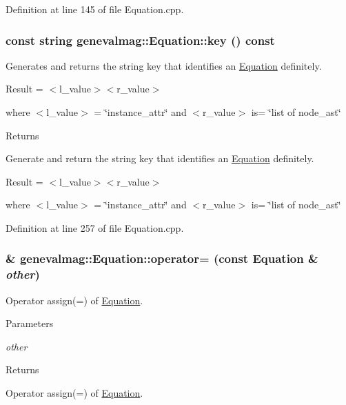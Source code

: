 Definition at line 145 of file Equation.cpp.

\hypertarget{classgenevalmag_1_1Equation_a2aa74b8b1df5b16dd9cc7d457cd7e370}{
\subsubsection[{key}]{\setlength{\rightskip}{0pt plus 5cm}const string genevalmag::Equation::key () const}}
\label{classgenevalmag_1_1Equation_a2aa74b8b1df5b16dd9cc7d457cd7e370}
Generates and returns the string key that identifies an \hyperlink{classgenevalmag_1_1Equation}{Equation} definitely.\par
 \par
 Result = $<$l\_\-value$>$$<$r\_\-value$>$\par
 \par
 where $<$l\_\-value$>$ = \char`\"{}instance\_\-attr\char`\"{} and $<$r\_\-value$>$ is= \char`\"{}list of node\_\-ast\char`\"{}\par


\begin{DoxyReturn}{Returns}

\end{DoxyReturn}
Generate and return the string key that identifies an \hyperlink{classgenevalmag_1_1Equation}{Equation} definitely.

Result = $<$l\_\-value$>$$<$r\_\-value$>$

where $<$l\_\-value$>$ = \char`\"{}instance\_\-attr\char`\"{} and $<$r\_\-value$>$ is= \char`\"{}list of node\_\-ast\char`\"{} 

Definition at line 257 of file Equation.cpp.

\hypertarget{classgenevalmag_1_1Equation_aeca9e6078293ec3897c64925307d2d71}{
\subsubsection[{operator=}]{ \& genevalmag::Equation::operator= (const {\bf Equation} \& {\em other})}}
\label{classgenevalmag_1_1Equation_aeca9e6078293ec3897c64925307d2d71}
Operator assign(=) of \hyperlink{classgenevalmag_1_1Equation}{Equation}. 
\begin{DoxyParams}{Parameters}
\item[{\em other}]\end{DoxyParams}
\begin{DoxyReturn}{Returns}

\end{DoxyReturn}
Operator assign(=) of \hyperlink{classgenevalmag_1_1Equation}{Equation}. 

